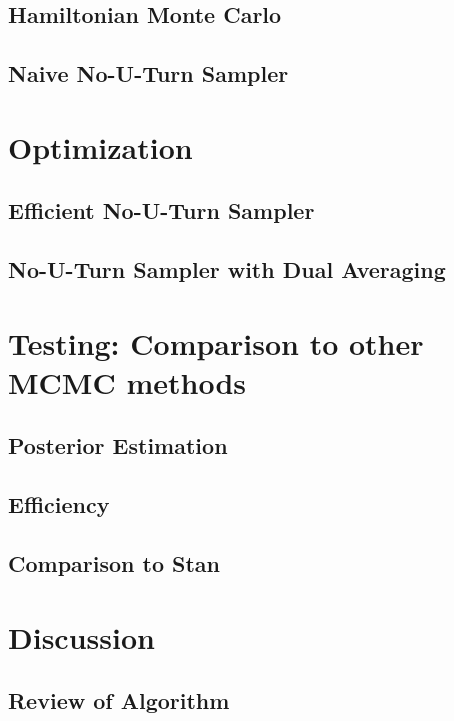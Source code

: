 \documentclass{article}
\begin{document}
\subsection{Hamiltonian Monte Carlo}
\subsection{Naive No-U-Turn Sampler}


\section{Optimization}
\subsection{Efficient No-U-Turn Sampler}
\subsection{No-U-Turn Sampler with Dual Averaging}


\section{Testing: Comparison to other MCMC methods}
\subsection{Posterior Estimation} 
\subsection{Efficiency}
\subsection{Comparison to Stan}

\section{Discussion}
\subsection{Review of Algorithm}
\end{document}

